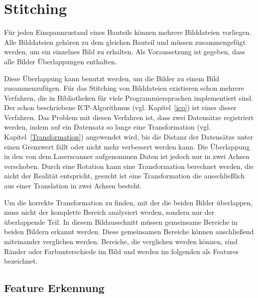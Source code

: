 
\chapter{Stitching}

Für jeden Einspannzustand eines Bauteils können mehrere Bilddateien vorliegen.
Alle Bilddateien gehören zu dem gleichen Bauteil und müssen 
zusammengefügt werden, um ein einzelnes Bild zu erhalten. 
Als Voraussetzung ist gegeben, dass alle Bilder Überlappungen enthalten.

Diese Überlappung kann benutzt werden, um die Bilder zu einem Bild zusammenzufügen.
Für das Stitching von Bilddateien existieren schon mehrere Verfahren, die in Bibliotheken
für viele Programmiersprachen implementiert sind. Der schon beschriebene 
ICP-Algorithmus (vgl. Kapitel~\ref{icp})
ist eines dieser Verfahren. Das Problem mit diesen Verfahren ist, dass zwei 
Datensätze registriert werden, indem auf ein Datensatz so lange eine 
Transformation (vgl. Kapitel~\ref*{Transformation}) angewendet wird, bis
die Distanz der Datensätze unter einen Grenzwert fällt oder nicht mehr verbessert
werden kann. Die Überlappung in den von dem Laserscanner aufgenommen Daten ist jedoch 
nur in zwei Achsen verschoben. Durch eine Rotation kann eine Transformation 
berechnet werden, die nicht der Realität entspricht, gesucht ist eine Transformation 
die ausschließlich aus einer Translation in zwei Achsen besteht.

Um die korrekte Transformation zu finden, mit der die beiden Bilder überlappen,
muss nicht der komplette Bereich analysiert werden, sondern nur der überlappende Teil.
In diesem Bildausschnitt müssen gemeinsame Bereiche in beiden Bildern erkannt werden. 
Diese gemeinsamen Bereiche können anschließend miteinander verglichen werden.
Bereiche, die verglichen werden können, sind Ränder oder Farbunterschiede im Bild 
und werden im folgenden als Features bezeichnet.

\section{Feature Erkennung} \label{contoursearching}

